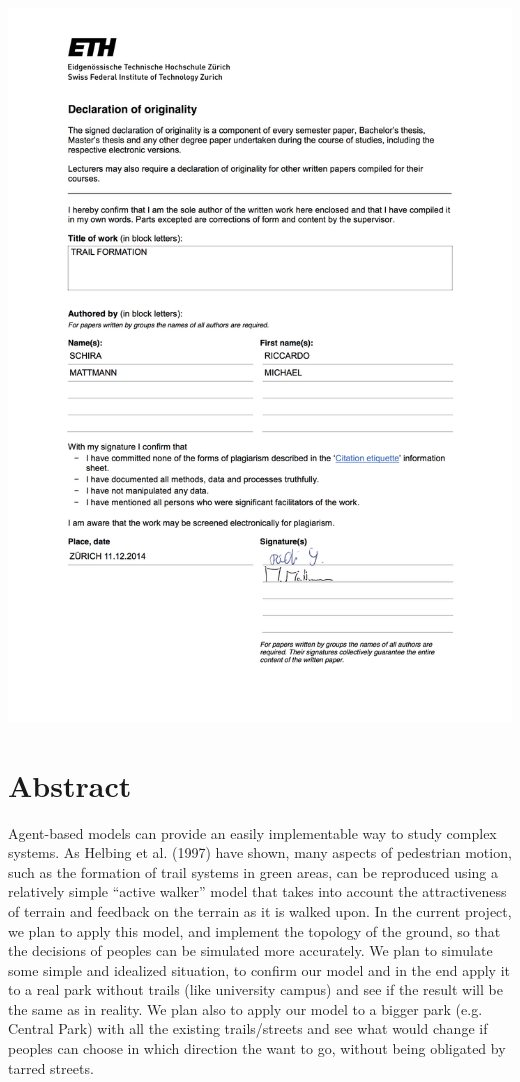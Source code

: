 \documentclass[11pt]{article}
\begin{document}
\includegraphics[width=\columnwidth]{declaration-originality.png}



\tableofcontents

\newpage




\section{Abstract}

Agent-based models can provide an easily implementable way to study complex systems. As Helbing et al. (1997) have shown, many aspects of pedestrian motion, such as the formation of trail systems in green areas, can be reproduced using a relatively simple “active walker” model that takes into account the attractiveness of terrain and feedback on the terrain as it is walked upon. In the current project, we plan to apply this model, and implement the topology of the ground, so that the decisions of peoples can be simulated more accurately. We plan to simulate some simple and idealized situation, to confirm our model and in the end apply it to a real park without trails (like university campus) and see if the result will be the same as in reality. We plan also to apply our model to a bigger park (e.g. Central Park) with all the existing trails/streets and see what would change if peoples can choose in which direction the want to go, without being obligated by tarred streets. 
\end{document}
